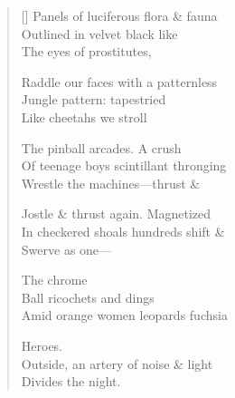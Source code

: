 \label{ch:in_the_arcades}
\settowidth{\versewidth}{Of teenage boys     scintillant      thronging}
\begin{verse}[\versewidth]
Panels of luciferous flora \& fauna\\
Outlined in velvet black     like\\
The eyes of prostitutes,

Raddle our faces with a patternless\\
Jungle pattern:   tapestried\\
Like cheetahs we stroll

The pinball arcades.     A crush\\
Of teenage boys     scintillant      thronging\\
Wrestle the machines---thrust \&

Jostle \& thrust again.     Magnetized\\
In checkered shoals hundreds shift \&\\
Swerve as one---

                              The chrome\\
Ball ricochets and dings\\
Amid orange women leopards fuchsia

                           Heroes.\\
Outside, an artery of noise \& light\\
Divides the night.
\end{verse}
